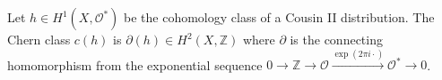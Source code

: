 Let $h \in H^1(X, \mathcal{O}^*)$ be the cohomology class of a Cousin II distribution. The Chern class $c(h)$ is $\partial(h) \in H^2(X, \mathbb{Z})$ where $\partial$ is the connecting homomorphism from the exponential sequence $0 \to \mathbb{Z} \to \mathcal{O} \xrightarrow{\exp(2\pi i \cdot)} \mathcal{O}^* \to 0$.
